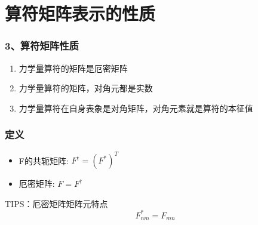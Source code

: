 \section{算符矩阵表示的性质}
\begin{frame} 
    \frametitle{3、算符矩阵性质} 
    \begin{enumerate}
    \item  力学量算符的矩阵是厄密矩阵 
    \item  力学量算符的矩阵，对角元都是实数
    \item  力学量算符在自身表象是对角矩阵，对角元素就是算符的本征值
    \end{enumerate}
\end{frame}

\begin{frame} 
    \frametitle{定义} 
    \begin{definition}
        \begin{itemize}
        \item F的共轭矩阵: $F^{\dagger } =(F^*)^T$
        \item 厄密矩阵: $F= F^{\dagger }$
    \end{itemize}
    TIPS：厄密矩阵矩阵元特点 $$  F_{nm}^* = F_{mn}  $$
    \end{definition}   
\end{frame}

